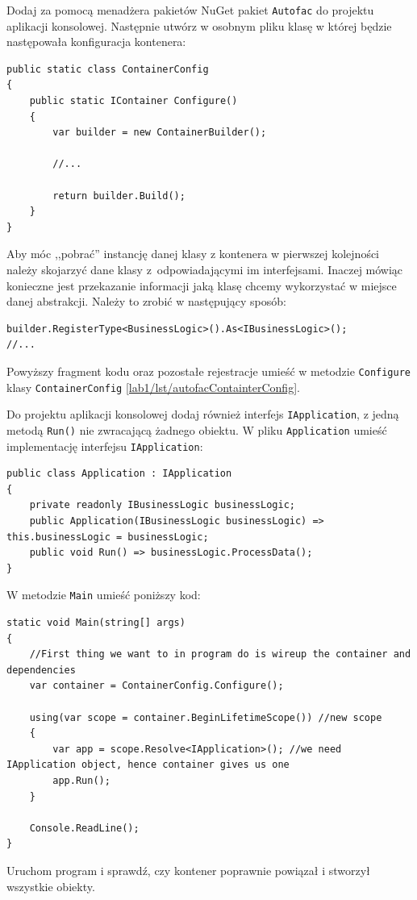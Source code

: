 Dodaj za pomocą menadżera pakietów NuGet pakiet \texttt{Autofac} do projektu aplikacji konsolowej.
Następnie utwórz w osobnym pliku klasę w której będzie następowała konfiguracja kontenera:
\begin{lstlisting}[caption={Konfiguracja kontenera IoC}, label={lab1/lst/autofacContainterConfig}]
public static class ContainerConfig
{
	public static IContainer Configure()
	{
		var builder = new ContainerBuilder();
		
		//...
		
		return builder.Build();
	}
}
\end{lstlisting}
Aby móc ,,pobrać'' instancję danej klasy z kontenera w pierwszej kolejności należy skojarzyć dane klasy z~odpowiadającymi im interfejsami. Inaczej mówiąc konieczne jest przekazanie informacji jaką klasę chcemy wykorzystać w miejsce danej abstrakcji. Należy to zrobić w następujący sposób:
\begin{lstlisting}
builder.RegisterType<BusinessLogic>().As<IBusinessLogic>();
//...
\end{lstlisting}
Powyższy fragment kodu oraz pozostałe rejestracje umieść w metodzie \texttt{Configure} klasy \texttt{ContainerConfig} \ref{lab1/lst/autofacContainterConfig}.

Do projektu aplikacji konsolowej dodaj również interfejs \texttt{IApplication}, z jedną metodą \texttt{Run()} nie zwracającą żadnego obiektu. W pliku \texttt{Application} umieść implementację interfejsu \texttt{IApplication}:
\begin{lstlisting}
public class Application : IApplication
{
	private readonly IBusinessLogic businessLogic;	
	public Application(IBusinessLogic businessLogic) => this.businessLogic = businessLogic;	
	public void Run() => businessLogic.ProcessData();
}
\end{lstlisting}

W metodzie \texttt{Main} umieść poniższy kod:
\begin{lstlisting}
static void Main(string[] args)
{
	//First thing we want to in program do is wireup the container and dependencies
	var container = ContainerConfig.Configure();
	
	using(var scope = container.BeginLifetimeScope()) //new scope 
	{
		var app = scope.Resolve<IApplication>(); //we need IApplication object, hence container gives us one
		app.Run();
	}
	
	Console.ReadLine();
}
\end{lstlisting}
Uruchom program i sprawdź, czy kontener poprawnie powiązał i stworzył wszystkie obiekty.

